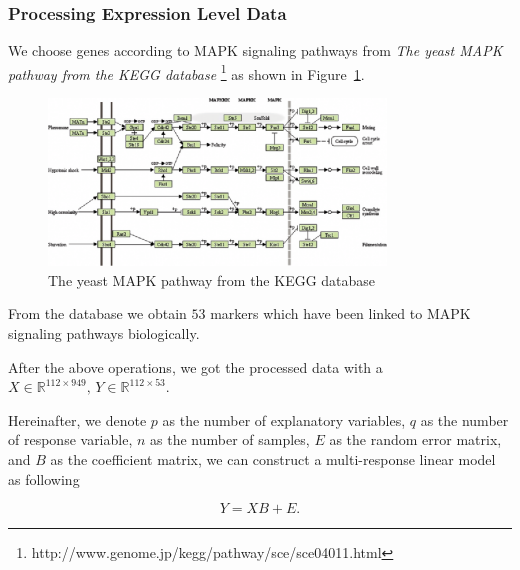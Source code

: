 \subsubsection{Processing Expression Level Data}

We choose genes according to MAPK signaling pathways \citep{kanehisa2013data} from \emph{The yeast MAPK pathway from the KEGG database} \footnote[1]{http://www.genome.jp/kegg/pathway/sce/sce04011.html} as shown in Figure~\ref{fig:MAPK}. 

\begin{figure}[ht]
    \centering
    \includegraphics[width=0.8\textwidth]{./figs/494f01.eps}
    \caption{The yeast MAPK pathway from the KEGG database}
    \label{fig:MAPK}
\end{figure}

From the database we obtain $53$ markers which have been linked to MAPK signaling pathways biologically. 

After the above operations, we got the processed data with a $X\in\mathbb{R}^{112 \times 949} ,\, Y\in\mathbb{R}^{112 \times 53}$. 

Hereinafter, we denote $p$ as the number of explanatory variables, $q$ as the number of response variable, $n$ as the number of samples, $E$ as the random error matrix, and $B$ as the coefficient matrix, we can construct a multi-response linear model as following

\begin{equation}\label{eq:model}
    Y = XB + E. 
\end{equation}
